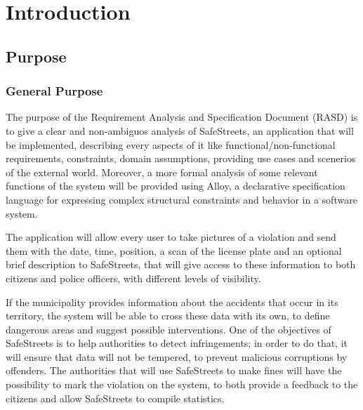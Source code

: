 \documentclass[../RASD.tex]{subfiles}
\begin{document}
    \chapter{Introduction}\label{ch:introduction}
    \section{Purpose}\label{sec:purpose}
    \subsection{General Purpose}\label{subsec:general-purpose}
    The purpose of the Requirement Analysis and Specification Document (RASD) is to give a clear and non-ambiguos analysis of SafeStreets,
    an application that will be implemented, describing every aspects of it like functional/non-functional requirements, constraints,
    domain assumptions, providing use cases and scenerios of the external world.
    Moreover, a more formal analysis of some relevant functions of the system will be provided using Alloy,
    a declarative specification language for expressing complex structural constraints and behavior in a software system.

    The application will allow every user to take pictures of a violation and send them with the date, time, position,
    a scan of the license plate and an optional brief description to SafeStreets, that will give access to these information
    to both citizens and police officers, with different levels of visibility.

    If the municipality provides information about the accidents that occur in its territory, the system will be able to cross these data with its own,
    to define dangerous areas and suggest possible interventions.
    One of the objectives of SafeStreets is to help authorities to detect infringements;
    in order to do that, it will ensure that data will not be tempered, to prevent malicious corruptions by offenders.
    The authorities that will use SafeStreets to make fines will have the possibility to mark the violation on the system,
    to both provide a feedback to the citizens and allow SafeStreets to compile statistics.
\end{document}

